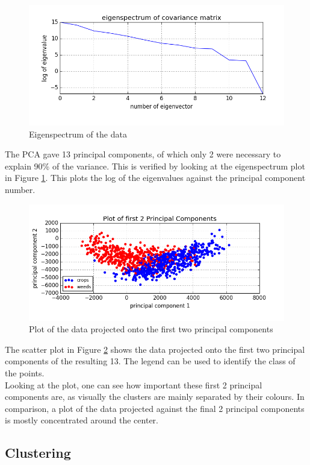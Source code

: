 \documentclass{scrartcl}
\begin{document}
\begin{figure}[h]
\includegraphics[width=16cm]{eig.png}
\caption{Eigenspectrum of the data}
\label{fig:eig}
\end{figure}

The PCA gave 13 principal components, of which only 2 were necessary to explain 90\% of the variance. This is verified by looking at the eigenspectrum plot in Figure \ref{fig:eig}. This plots the log of the eigenvalues against the principal component number. \\

\begin{figure}[h]
\includegraphics[width=16cm]{2pc.png}
\caption{Plot of the data projected onto the first two principal components}
\label{fig:2pc}
\end{figure}

The scatter plot in Figure \ref{fig:2pc} shows the data projected onto the first two principal components of the resulting 13. The legend can be used to identify the class of the points. \\

Looking at the plot, one can see how important these first 2 principal components are, as visually the clusters are mainly separated by their colours. In comparison, a plot of the data projected against the final 2 principal components is mostly concentrated around the center.

\subsection{Clustering}



\newpage
\printbibliography
\end{document}
